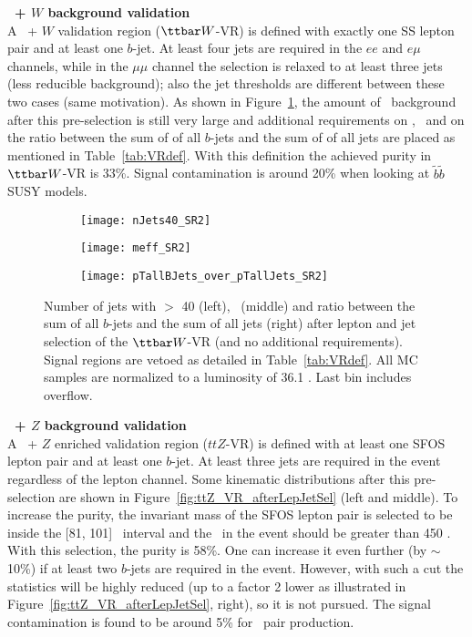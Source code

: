 \par{\bf \ttbar\ + $W$ background validation\\}
A \ttbar\ + $W$ validation region ($\ttbar W$-VR) is defined with exactly one SS lepton pair and at least one $b$-jet. At least four jets are required in the $ee$ and $e\mu$ channels, while in the $\mu\mu$ channel the selection is relaxed to at least three jets  (less reducible background); also the jet \pt thresholds are different between these two cases (same motivation). As shown in Figure~\ref{fig:ttW_VR_afterLepJetSel}, the amount of \ttbar\ background after this pre-selection is still very large and additional requirements on \met, \meff\ and on the ratio between the sum of \pt of all $b$-jets and the sum of \pt of all jets are placed as mentioned in Table~\ref{tab:VRdef}. With this definition the achieved purity in $\ttbar W$-VR is 33\%. 
Signal contamination is around 20\% when looking at $\tilde b\tilde b$ SUSY 
models.

\begin{figure}[t!]
\centering
\begin{subfigure}[t]{0.32\textwidth}
\texttt{[image: nJets40\_SR2]}
\end{subfigure}
\begin{subfigure}[t]{0.32\textwidth}
\texttt{[image: meff\_SR2]}
\end{subfigure}
\begin{subfigure}[t]{0.32\textwidth}
\texttt{[image: pTallBJets\_over\_pTallJets\_SR2]}
\end{subfigure}
\caption{Number of jets with \pt $>$ 40 \GeV (left), \meff\ (middle) and ratio between the sum of all $b$-jets \pt and the sum of all jets \pt (right) after lepton and jet selection of the $\ttbar W$-VR (and no additional requirements). Signal regions are vetoed as detailed in Table~\ref{tab:VRdef}. All MC samples are normalized to a luminosity of 36.1 \ifb. Last bin includes overflow.
}
\label{fig:ttW_VR_afterLepJetSel}
\end{figure} 

\par{\bf \ttbar\ + $Z$ background validation\\}
A \ttbar\ + $Z$ enriched validation region ($ttZ$-VR) is defined with at least one SFOS lepton pair and at least one $b$-jet. At least three jets are required in the event regardless of the lepton channel. Some kinematic distributions after this pre-selection are shown in Figure~\ref{fig:ttZ_VR_afterLepJetSel} (left and middle). To increase the purity, the invariant mass of the SFOS lepton pair is selected to be inside the [81, 101]~ \GeV interval and the \meff\ in the event should be greater than 450 \GeV. With this selection, the purity is 58\%. One can increase it even further (by $\sim$10\%) if at least two $b$-jets are required in the event. However, with such a cut the statistics will be highly reduced (up to a factor 2 lower as illustrated in Figure~\ref{fig:ttZ_VR_afterLepJetSel}, right), so it is not pursued. The signal contamination is found to be around 5\% for \sbsb\ pair production.


